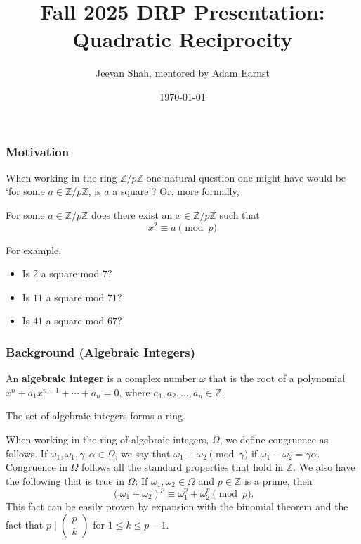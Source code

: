 \documentclass{beamer}
\title[The Law of Quadratic Reciprocity]{Fall 2025 DRP Presentation: Quadratic Reciprocity}
\author[Jeevan Shah]{Jeevan Shah, mentored by Adam Earnst}
\institute{Rutgers University}
\date{\today}
\newcommand{\ZZ}{\mathbb{Z}}
\begin{document}
\begin{frame}
    \titlepage
\end{frame}

\begin{frame}
    \frametitle{Motivation}
    When working in the ring $\ZZ/p\ZZ$ one natural question one might have would be `for some $a \in \ZZ/p\ZZ$, is $a$ a square'? Or, more formally, 
    \begin{block}{}
        For some $a \in \ZZ/p\ZZ$ does there exist an $x \in \ZZ/p\ZZ$ such that
        \[
            x^2 \equiv a \pmod{p} 
        \]
    \end{block}
    For example,
    \begin{itemize}
        \item Is $2$ a square mod $7$?
        \item Is $11$ a square mod $71$?
        \item Is $41$ a square mod $67$?
    \end{itemize}
\end{frame}

\begin{frame}
    \frametitle{Background (Algebraic Integers)}
    \begin{definition}
        An \textbf{algebraic integer} is a complex number $\omega$ that is the root of a polynomial $x^n + a_{1}x^{n-1} + \cdots + a_n = 0$, where $a_1, a_2, \ldots, a_n \in \mathbb{Z}$.
    \end{definition} 
    \begin{theorem}
        The set of algebraic integers forms a ring.
    \end{theorem}
    When working in the ring of algebraic integers, $\Omega$, we define congruence as follows. If $\omega_1, \omega_1, \gamma, \alpha \in \Omega$, we say that $\omega_1 \equiv \omega_2 \pmod{\gamma}$ if $\omega_1 - \omega_2 = \gamma\alpha$. Congruence in $\Omega$ follows all the standard properties that hold in $\mathbb{Z}$. We also have the following that is true in $\Omega$: If $\omega_1, \omega_2 \in \Omega$ and $p \in \mathbb{Z}$ is a prime, then 
    \[
        \left(\omega_1 + \omega_2\right)^{p} \equiv \omega_1^p + \omega_2^p \pmod{p}. 
    \]
    This fact can be easily proven by expansion with the binomial theorem and the fact that $p \mid \left(\begin{smallmatrix} p \\ k \end{smallmatrix}\right)$ for $1 \leq k \leq p-1$.
\end{frame}
\end{document}

